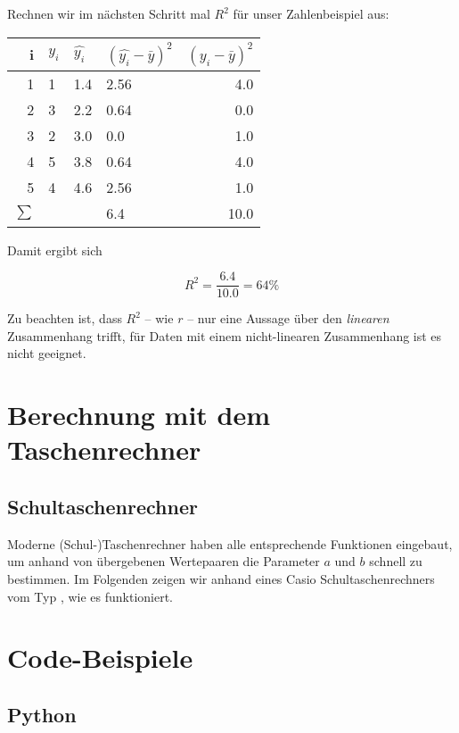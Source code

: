 \documentclass[ngerman, 12pt]{scrartcl}
\begin{document}
Rechnen wir im nächsten Schritt mal \(R^2\) für unser Zahlenbeispiel aus:

\begin{center}
\begin{tabular}{r|lllr} \toprule
i & \(y_i\)  & \(\hat{y_i}\) & \((\hat{y_i} - \bar{y})^2 \)&  \((y_i - \bar{y})^2\) \\ \midrule
1 & 1 &  1.4 & 2.56    & 4.0\\
2 & 3 &  2.2 &  0.64 & 0.0\\
3 & 2 &  3.0 & 0.0     & 1.0\\ 
4 & 5 &  3.8 & 0.64    & 4.0\\ 
5 & 4 &  4.6 & 2.56    & 1.0\\ \midrule
\(\sum\) & & & 6.4 & 10.0\\ \bottomrule
\end{tabular}
\end{center}

Damit ergibt sich

\begin{equation}
R^2 = \frac{6.4}{10.0} = 64 \%
\end{equation}


Zu beachten ist, dass \(R^2\) -- wie \(r\) -- nur eine Aussage über den \textit{linearen} Zusammenhang trifft, für Daten mit einem nicht-linearen Zusammenhang ist es nicht geeignet.

\section{Berechnung mit dem Taschenrechner}

\subsection{Schultaschenrechner}

Moderne (Schul-)Taschenrechner haben alle entsprechende Funktionen eingebaut, um anhand von übergebenen Wertepaaren die Parameter $a$ und $b$ schnell zu bestimmen. Im Folgenden zeigen wir anhand eines Casio Schultaschenrechners vom Typ , wie es funktioniert. 



\section{Code-Beispiele}


\subsection{Python}
\end{document}
